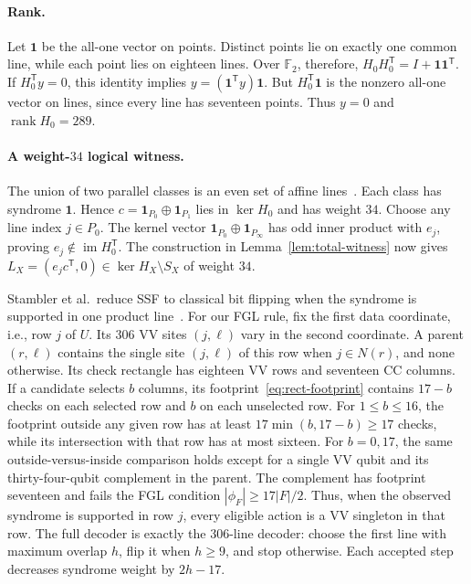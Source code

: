 \documentclass[10pt,twocolumn]{article}
\theoremstyle{definition}
\newcommand{\Ftwo}{\mathbb{F}_2}
\DeclareMathOperator{\im}{im}
\begin{document}
\paragraph{Rank.}
Let $\mathbf1$ be the all-one vector on points. Distinct points lie
on exactly one common line, while each point lies on eighteen lines.
Over $\Ftwo$, therefore,
$H_0H_0^{\mathsf T}=I+\mathbf1\mathbf1^{\mathsf T}$.
If $H_0^{\mathsf T}y=0$, this identity implies
$y=(\mathbf1^{\mathsf T}y)\mathbf1$. But
$H_0^{\mathsf T}\mathbf1$ is the nonzero all-one vector on lines,
since every line has seventeen points. Thus $y=0$ and
$\operatorname{rank}H_0=289$.

\paragraph{A weight-$34$ logical witness.}
The union of two parallel classes is an even set of affine
lines~\cite[Sec.~4]{MJ04}. Each class has syndrome $\mathbf1$. Hence
$c=\mathbf1_{P_0}\oplus\mathbf1_{P_1}$ lies in $\ker H_0$ and has
weight $34$. Choose any line index $j\in P_0$.
The kernel vector $\mathbf1_{P_0}\oplus\mathbf1_{P_\infty}$ has odd
inner product with $e_j$, proving $e_j\notin\im H_0^{\mathsf T}$.
The construction in Lemma~\ref{lem:total-witness} now gives
$L_X=(e_jc^{\mathsf T},0)\in\ker H_X\setminus S_X$ of weight $34$.

Stambler et al.\ reduce SSF to classical bit flipping when the syndrome
is supported in one product line~\cite[Lemma~1]{SKB23}. For our FGL rule,
fix the first data coordinate, i.e., row $j$ of $U$. Its 306 VV
sites $(j,\ell)$ vary in the second coordinate. A parent $(r,\ell)$
contains the single site $(j,\ell)$ of this row when $j\in N(r)$,
and none otherwise. Its check rectangle has eighteen VV rows and
seventeen CC columns. If a candidate selects $b$ columns, its
footprint~\eqref{eq:rect-footprint} contains $17-b$ checks on each
selected row and $b$ on each unselected row. For $1\le b\le16$, the
footprint outside any given row has at least $17\min(b,17-b)\ge17$ checks,
while its intersection with that row has at most sixteen. For $b=0,17$,
the same outside-versus-inside comparison holds except for a single VV
qubit and its thirty-four-qubit complement in the parent. The complement
has footprint seventeen and fails the FGL condition
$|\phi_F|\ge17|F|/2$. Thus, when the observed syndrome is supported in
row $j$, every eligible action is a VV singleton in that row. The full
decoder is exactly the $306$-line decoder: choose the first line with
maximum overlap $h$, flip it when $h\ge9$, and stop otherwise.
Each accepted step decreases syndrome weight by $2h-17$.
\end{document}
